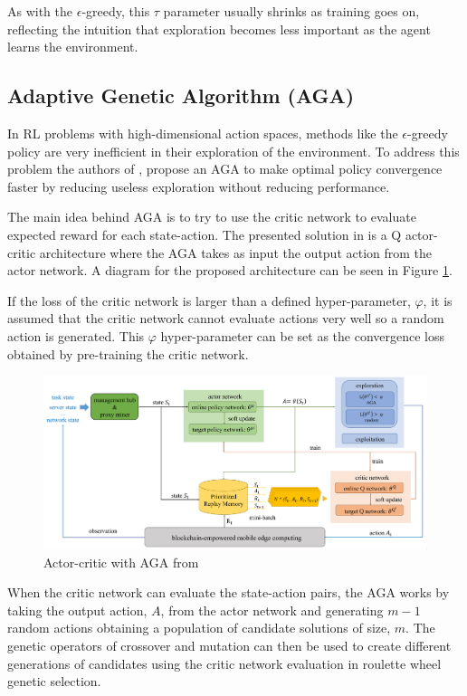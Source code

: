 As with the $\epsilon$-greedy, this $\tau$ parameter usually shrinks as training goes on, reflecting the intuition that exploration becomes less important as the agent learns the environment.

\subsection{Adaptive Genetic Algorithm (AGA)}
\noindent In \acrshort{RL} problems with high-dimensional action spaces, methods like the $\epsilon$-greedy policy are very inefficient in their exploration of the environment. To address this problem the authors of \cite{AGAcrypto}, propose an \acrfull{AGA} to make optimal policy convergence faster by reducing useless exploration without reducing performance.

The main idea behind \acrshort{AGA} is to try to use the critic network to evaluate expected reward for each state-action. The presented solution in \cite{AGAcrypto} is a Q actor-critic architecture where the \acrshort{AGA} takes as input the output action from the actor network. A diagram for the proposed architecture can be seen in Figure \ref{AGAcryptoImag}.

If the loss of the critic network is larger than a defined hyper-parameter, $\varphi$, it is assumed that the critic network cannot evaluate actions very well so a random action is generated. This $\varphi$ hyper-parameter can be set as the convergence loss obtained by pre-training the critic network.

\begin{figure}[h]
  \centering
  \includegraphics[width=\textwidth]{images/AGA.png}
  \caption{Actor-critic with AGA from \cite{AGAcrypto}} \label{AGAcryptoImag}
\end{figure}

When the critic network can evaluate the state-action pairs, the \acrshort{AGA} works by taking the output action, $A$, from the actor network and generating $m-1$ random actions obtaining a population of candidate solutions of size, $m$. The genetic operators of crossover and mutation can then be used to create different generations of candidates using the critic network evaluation in roulette wheel genetic selection.

